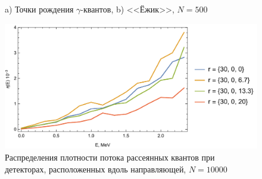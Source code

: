 \documentclass[
11pt,
master, %
subf, %
href, %
colorlinks=true, %
]{disser}
\begin{document}
\begin{figure}[htbp]
\begin{minipage}[h]{0.3\linewidth}
\end{minipage}
\hfill
\begin{minipage}[h]{0.68\linewidth}
\end{minipage}
\caption{a) Точки рождения $\gamma$-квантов, b) <<Ёжик>>, $N = 500$}
\label{}
\end{figure}

\newpage
\begin{figure}[htbp]
  \centering
  \includegraphics[width=0.95\linewidth]{10k_1}
  \caption{Распределения плотности потока рассеянных
квантов при детекторах, расположенных вдоль направляющей, $N = 10000$}\label{}
\end{figure}
\end{document}
